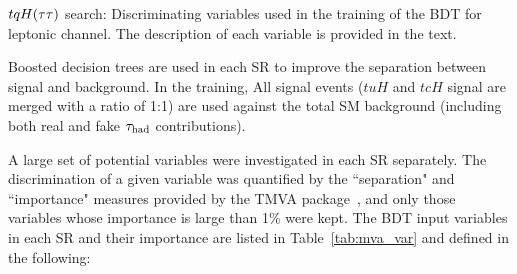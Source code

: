 \begin{table*}[t!]
\caption{\small{$tqH(\tau\tau)$ search: Discriminating variables used in the training of the BDT for leptonic channel. 
The description of each variable is provided in the text.}}

\end{table*}

Boosted decision trees are used in each SR to improve the separation between signal and background. 
In the training, All signal events ($tuH$ and $tcH$ signal are merged with a ratio of 1:1) are used against the total SM background (including both real and fake $\tau_{\mathrm{had}}$ contributions).

A large set of potential variables were investigated in each SR separately. The discrimination of a given variable was quantified by the ``separation" and ``importance" measures provided by the TMVA package~\cite{Hocker:2007ht}, and only those variables whose importance is large than 1\% were kept.
The BDT input variables in each SR and their importance are listed in Table~\ref{tab:mva_var} and defined in the following:
